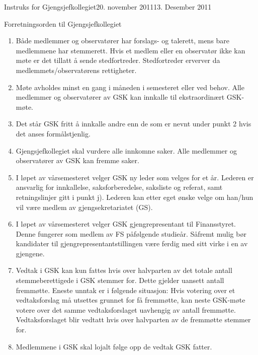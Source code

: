\documentclass[../fsbok.tex]{subfiles}
\begin{document}
\begin{instruks}{Instruks for Gjengsjefkollegiet}{20. november 2011}{13. Desember 2011}
    \begin{instruksledd}{Forretningsorden til Gjengsjefkollegiet}
        \begin{enumerate}
            \item Både medlemmer og observatører har forslags- og talerett, mens bare medlemmene
                har stemmerett. Hvis et
                medlem eller en observatør ikke kan møte er det tillatt å sende stedfortreder.
                Stedfortreder erverver da
                medlemmets/observatørens rettigheter.
            \item Møte avholdes minst en gang i måneden i semesteret eller ved behov. Alle
                medlemmer og observatører av
                GSK kan innkalle til ekstraordinært GSK-møte.
            \item Det står GSK fritt å innkalle andre enn de som er nevnt under punkt 2 hvis det
                anses formålstjenlig.
            \item Gjengsjefkollegiet skal vurdere alle innkomne saker. Alle medlemmer og
                observatører av GSK kan fremme
                saker.
            \item I løpet av vårsemesteret velger GSK ny leder som velges for et år. Lederen er
                ansvarlig for innkallelse,
                saksforberedelse, saksliste og referat, samt retningslinjer gitt i punkt j).
                Lederen kan etter eget ønske velge
                om han/hun vil være medlem av gjengsekretariatet (GS).
            \item
                I løpet av vårsemesteret velger GSK gjengrepresentant til Finansstyret. Denne
                fungerer som medlem av FS
                påfølgende studieår. Såfremt mulig bør kandidater til gjengrepresentantstillingen
                være ferdig med sitt virke i
                en av gjengene.
            \item Vedtak i GSK kan kun fattes hvis over halvparten av det totale antall
                stemmeberettigede i GSK stemmer for.
                Dette gjelder uansett antall fremmøtte. Eneste unntak er i følgende situasjon:
                Hvis votering over et
                vedtaksforslag må utsettes grunnet for få fremmøtte, kan neste GSK-møte votere
                over det samme
                vedtaksforslaget uavhengig av antall fremmøtte. Vedtaksforslaget blir vedtatt hvis
                over halvparten av de
                fremmøtte stemmer for.
            \item Medlemmene i GSK skal lojalt følge opp de vedtak GSK fatter.

\end{enumerate}
\end{instruksledd}
\end{instruks}
\end{document}
